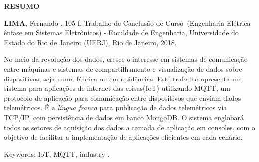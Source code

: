 \begin{center}
\textbf{RESUMO}
\end{center}

%
%

$\!$\\

\hspace{-1.3cm}\textbf{LIMA}, Fernando \textit{\setTitulo}. 105 f. Trabalho de Conclusão de Curso~(Engenharia Elétrica ênfase em Sistemas Eletrônicos) - Faculdade de Engenharia, Universidade do Estado do Rio de Janeiro (UERJ), Rio de Janeiro, 2018.

\vspace{.2cm}

No meio da revolução dos dados, cresce o interesse em sistemas de comunicação entre máquinas e sistemas de compartilhamento e visualização de dados  sobre dispositivos, seja numa fábrica ou em residências. Este trabalho apresenta um sistema para aplicações de internet das coisas(IoT) utilizando MQTT, um protocolo de aplicação para comunicação entre dispositivos que enviam dados telemétricos. É  a \textit{língua franca} para publicação de dados telemétricos via TCP/IP, com persistência de dados em banco MongoDB. O sistema englobará todos os setores de aquisição dos dados a camada de aplicação em consoles, com o objetivo de facilitar a implementação de aplicações eficientes em cada cenário.

\vspace{1cm}

\hspace{-1.3cm}Keywords: IoT, MQTT, industry .